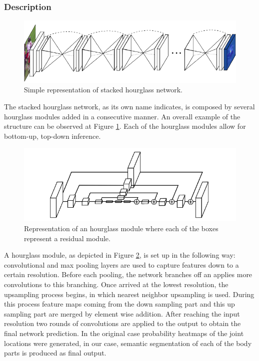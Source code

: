 \subsubsection{Description}

\begin{figure}
\centering
\includegraphics[scale=0.7]{stacked.png}
\caption{Simple representation of stacked hourglass network.}
\label{hourglass:stacked}
\end{figure}


The stacked hourglass network, as its own name indicates, is composed by several hourglass modules added in a consecutive manner. An overall example of the structure can be observed at Figure \ref{hourglass:stacked}. Each of the hourglass modules allow for bottom-up, top-down inference.\\

\begin{figure}
\centering
\includegraphics[scale=0.7]{hourmodule.png}
\caption{Representation of an hourglass module where each of the boxes represent a residual module.}
\label{hourglass:module}
\end{figure}

A hourglass module, as depicted in Figure \ref{hourglass:module}, is set up in the following way: convolutional and max pooling layers are used to capture features down to a certain resolution. Before each pooling, the network branches off an applies more convolutions to this branching. Once arrived at the lowest resolution, the upsampling process begins, in which nearest neighbor upsampling is used. During this process feature maps coming from the down sampling part and this up sampling part are merged by element wise addition. After reaching the input resolution two rounds of convolutions are applied to the output to obtain the final network prediction. In the original case probability heatmaps of the joint locations were generated, in our case, semantic segmentation of each of the body parts is produced as final output.\\

